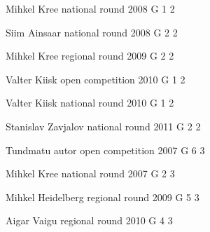 \documentclass[11pt]{article}
\begin{document}
\ylDisplay{} %
{Mihkel Kree} %
{national round} %
{2008} %
{G 1} %
{2} %
{

\ifEngStatement
\fi
}

\ylDisplay{} %
{Siim Ainsaar} %
{national round} %
{2008} %
{G 2} %
{2} %
{

\ifEngStatement
\fi
}

\ylDisplay{} %
{Mihkel Kree} %
{regional round} %
{2009} %
{G 2} %
{2} %
{

\ifEngStatement
\fi
}

\ylDisplay{} %
{Valter Kiisk} %
{open competition} %
{2010} %
{G 1} %
{2} %
{

\ifEngStatement
\fi
}

\ylDisplay{} %
{Valter Kiisk} %
{national round} %
{2010} %
{G 1} %
{2} %
{

\ifEngStatement
\fi
}

\ylDisplay{} %
{Stanislav Zavjalov} %
{national round} %
{2011} %
{G 2} %
{2} %
{

\ifEngStatement
\fi
}

\ylDisplay{} %
{Tundmatu autor} %
{open competition} %
{2007} %
{G 6} %
{3} %
{

\ifEngStatement
\fi
}

\ylDisplay{} %
{Mihkel Kree} %
{national round} %
{2007} %
{G 2} %
{3} %
{

\ifEngStatement
\fi
}

\ylDisplay{} %
{Mihkel Heidelberg} %
{regional round} %
{2009} %
{G 5} %
{3} %
{

\ifEngStatement
\fi
}

\ylDisplay{} %
{Aigar Vaigu} %
{regional round} %
{2010} %
{G 4} %
{3} %
{

\ifEngStatement
\fi
}
\end{document}
